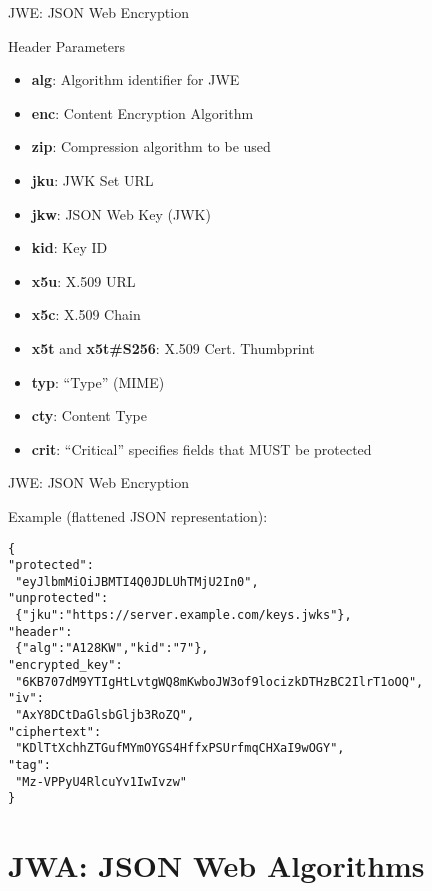\begin{frame}{JWE: JSON Web Encryption}

Header Parameters

\begin{itemize}
\itemsep1pt\parskip0pt
\item
  \textbf{alg}: Algorithm identifier for JWE
\item
  \textbf{enc}: Content Encryption Algorithm
\item
  \textbf{zip}: Compression algorithm to be used
\item
  \textbf{jku}: JWK Set URL
\item
  \textbf{jkw}: JSON Web Key (JWK)
\item
  \textbf{kid}: Key ID
\item
  \textbf{x5u}: X.509 URL
\item
  \textbf{x5c}: X.509 Chain
\item
  \textbf{x5t} and \textbf{x5t\#S256}: X.509 Cert. Thumbprint
\item
  \textbf{typ}: ``Type'' (MIME)
\item
  \textbf{cty}: Content Type
\item
  \textbf{crit}: ``Critical'' specifies fields that MUST be protected
\end{itemize}

\end{frame}

\begin{frame}[fragile]{JWE: JSON Web Encryption}

Example (flattened JSON representation):

\small

\begin{verbatim}
{
"protected":
 "eyJlbmMiOiJBMTI4Q0JDLUhTMjU2In0",
"unprotected":
 {"jku":"https://server.example.com/keys.jwks"},
"header":
 {"alg":"A128KW","kid":"7"},
"encrypted_key":
 "6KB707dM9YTIgHtLvtgWQ8mKwboJW3of9locizkDTHzBC2IlrT1oOQ",
"iv":
 "AxY8DCtDaGlsbGljb3RoZQ",
"ciphertext":
 "KDlTtXchhZTGufMYmOYGS4HffxPSUrfmqCHXaI9wOGY",
"tag":
 "Mz-VPPyU4RlcuYv1IwIvzw"
}
\end{verbatim}

\end{frame}

\section{JWA: JSON Web Algorithms}\label{jwa-json-web-algorithms}

